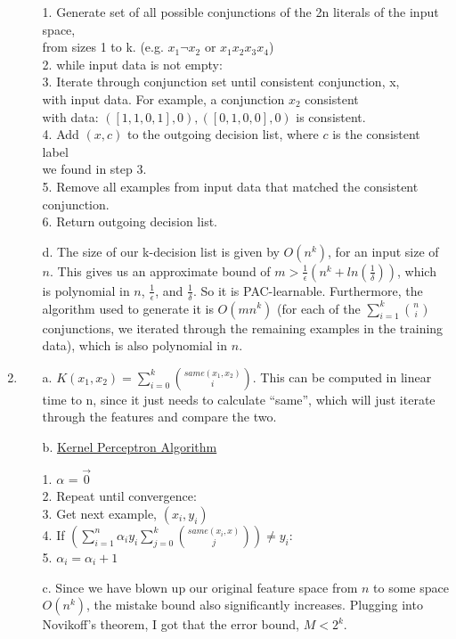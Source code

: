 \begin{enumerate}
\begin{enumerate}
    \begin{algorithm}
        1. Generate set of all possible conjunctions of the 2n literals of the input space,\\ from sizes 1 to k. (e.g. $x_1 \neg x_2$ or $x_1 x_2 x_3 x_4 $)\\
        2. while input data is not empty:\\
        3. \>\> Iterate through conjunction set until consistent conjunction, x, \\                  \>\>with input data. For example, a conjunction $x_2$ consistent   \\                \>\> with data: $([1,1,0,1],0), ([0,1,0,0],0)$ is consistent.\\
        4. \>\>Add $(x,c)$ to the outgoing decision list, where $c$ is the consistent label\\ 
           \>\>we found in step 3.\\
        5. \>\> Remove all examples from input data that matched the consistent conjunction.\\
        6. Return outgoing decision list.\\
    \end{algorithm}
    \item [d.] The size of our k-decision list is given by $O(n^k)$, for an input size of $n$. This gives us an approximate bound of $m > \frac{1}{\epsilon}(n^k + ln(\frac{1}{\delta}))$, which is polynomial in $n$, $\frac{1}{\epsilon}$, and $\frac{1}{\delta}$. So it is PAC-learnable. Furthermore, the algorithm used to generate it is $O(mn^k)$ (for each of the $\sum \limits_{i=1}^k {n \choose i}$ conjunctions, we iterated through the remaining examples in the training data), which is also polynomial in $n$.
    \end{enumerate}
\item 
    \begin{enumerate}
    \item [a.] $K(x_1,x_2) = \sum \limits_{i=0}^k {same(x_1,x_2) \choose i}$. This can be computed in linear time to n, since it just needs to calculate ``same'', which will just iterate through the features and compare the two.
    \item [b.] \underline{Kernel Perceptron Algorithm}
    \begin{algorithm}
        1. $\alpha$ = $\vec{0}$\\
        2. Repeat until convergence:\\
        3. \>\> Get next example, $(x_i,y_i)$\\
        4. \>\>If $(\sum \limits_{i=1}^n \alpha_i y_i \sum \limits_{j=0}^k {same(x_i,x) \choose j}) \neq y_i$:\\
        5. \>\>\> $\alpha_i = \alpha_i + 1$
    \end{algorithm}
    \item [c.] 
        Since we have blown up our original feature space from $n$ to some space $O(n^k)$, the mistake bound also significantly increases. Plugging into Novikoff's theorem, I got that the error bound, $M < 2^k$.
    \end{enumerate}
\end{enumerate}



